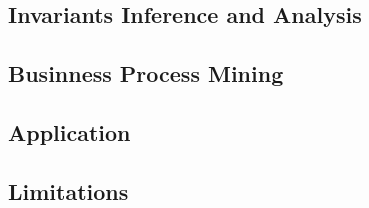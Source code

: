 \subsection{Invariants Inference and Analysis}
\label{subsec:ceccato_invariants}

\subsection{Businness Process Mining}
\label{subsec:ceccato_businessprocess}

\subsection{Application}
\label{subsec:ceccato_application}

\subsection{Limitations}
\label{subsec:ceccato_limitations}

\nolinenumbers
\vfill